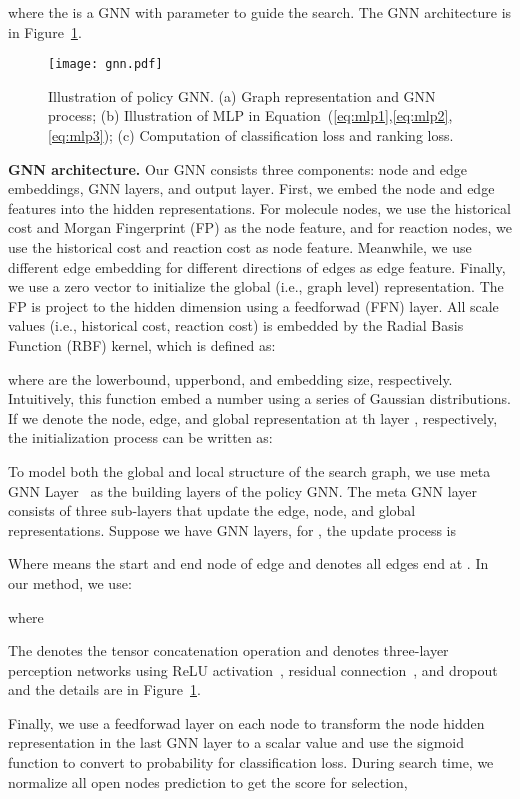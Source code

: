 \documentclass[sigconf]{acmart}
\begin{document}
where the  is a GNN with parameter  to guide the search.
The GNN architecture is in Figure~\ref{fig:gnn}.

\begin{figure}[!htbp]
    \centering
    \texttt{[image: gnn.pdf]}
\caption{Illustration of policy GNN. (a) Graph representation and GNN process; (b) Illustration of MLP in Equation~(\ref{eq:mlp1},\ref{eq:mlp2},\ref{eq:mlp3}); (c) Computation of classification loss and ranking loss.}
    \label{fig:gnn}
\end{figure}

\noindent\textbf{GNN architecture.}
Our GNN consists three components: node and edge embeddings, GNN layers, and output layer.
First, we embed the node and edge features into the hidden representations.
For molecule nodes, we use the historical cost and Morgan Fingerprint (FP) as the node feature, and for reaction nodes, we use the historical cost and reaction cost as node feature.
Meanwhile, we use different edge embedding for different directions of edges as edge feature.
Finally, we use a zero vector to initialize the global (i.e., graph level) representation.
The FP is project to the hidden dimension using a feedforwad (FFN) layer.
All scale values (i.e., historical cost, reaction cost) is embedded by the Radial Basis Function (RBF) kernel, which is defined as:


where  are the lowerbound, upperbond, and embedding size, respectively.
Intuitively, this function embed a number  using a series of Gaussian distributions.
If we denote the node, edge, and global representation at th layer , respectively, the initialization process can be written as:


To model both the global and local structure of the search graph, we use meta GNN Layer~\cite{battaglia2018relational} as the building layers of the policy GNN.
The meta GNN layer consists of three sub-layers that update the edge, node, and global representations.
Suppose we have  GNN layers, for , the update process is

Where  means the start and end node of edge  and  denotes all edges  end at .
In our method, we use:


where

The  denotes the tensor concatenation operation and  denotes three-layer perception networks using ReLU activation~\cite{agarap2018deep}, residual connection~\cite{he2016}, and dropout~\cite{Srivastava2014} and the details are in Figure~\ref{fig:gnn}.

Finally, we use a feedforwad layer on each node to transform the node hidden representation in the last GNN layer  to a scalar value  and use the sigmoid function to convert  to probability  for classification loss.
During search time, we normalize all open nodes prediction to get the score for selection,
\end{document}
